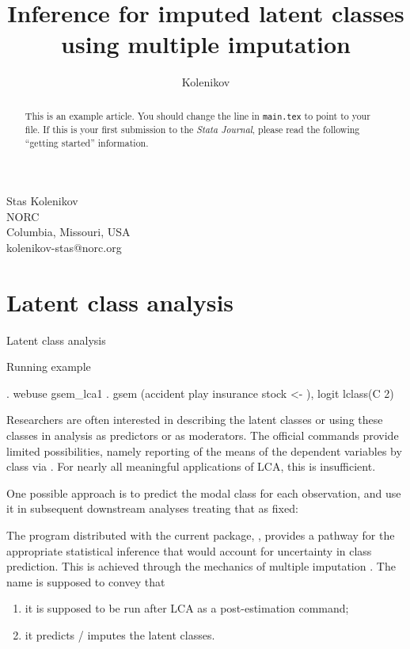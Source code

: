 \author{Kolenikov}{%
  Stas Kolenikov\\NORC\\Columbia, Missouri, USA\\kolenikov-stas@norc.org
}
\title[Post-estimation for LCA via MI]{Inference for imputed latent classes using multiple imputation}
\maketitle

\begin{abstract}
This is an example article.  You should change the \verb++ line in
\texttt{main.tex} to point to your file.  If this is your first submission to
the {\sl Stata Journal}, please read the following ``getting started''
information.

\end{abstract}

\section{Latent class analysis}

Latent class analysis 

Running example

\begin{stlog}
. webuse gsem_lca1
\smallskip
. gsem (accident play insurance stock <- ), logit lclass(C 2)
\end{stlog}

Researchers are often interested in describing the latent classes
or using these classes in analysis as predictors or as moderators.
The official  commands provide
limited possibilities, namely reporting of the means
of the dependent variables by class via .
For nearly all meaningful applications of LCA, this is insufficient.

One possible approach is to predict the modal class for each
observation, and use it in subsequent downstream analyses 
treating that as fixed:



The program distributed with the current package,
, provides a pathway for the appropriate
statistical inference that would account for uncertainty in class prediction.
This is achieved through the mechanics of multiple imputation
\citep{vanbuuren:2018:fimd2}. 
The name is supposed to convey that
\begin{enumerate}
  \item it is supposed to be run after LCA as a post-estimation command;
  \item it predicts / imputes the latent classes.
\end{enumerate}

